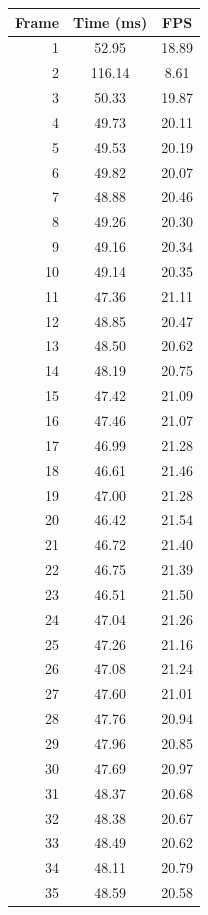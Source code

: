 \begin{table}[htbp]
  \centering\small
  \setlength{\tabcolsep}{8pt}
  \begin{tabular}{@{}rcc@{}}
    \toprule
    \textbf{Frame} & \textbf{Time (ms)} & \textbf{FPS} \\
    \midrule
    1 & 52.95 & 18.89 \\
    2 & 116.14 & 8.61 \\
    3 & 50.33 & 19.87 \\
    4 & 49.73 & 20.11 \\
    5 & 49.53 & 20.19 \\
    6 & 49.82 & 20.07 \\
    7 & 48.88 & 20.46 \\
    8 & 49.26 & 20.30 \\
    9 & 49.16 & 20.34 \\
    10 & 49.14 & 20.35 \\
    11 & 47.36 & 21.11 \\
    12 & 48.85 & 20.47 \\
    13 & 48.50 & 20.62 \\
    14 & 48.19 & 20.75 \\
    15 & 47.42 & 21.09 \\
    16 & 47.46 & 21.07 \\
    17 & 46.99 & 21.28 \\
    18 & 46.61 & 21.46 \\
    19 & 47.00 & 21.28 \\
    20 & 46.42 & 21.54 \\
    21 & 46.72 & 21.40 \\
    22 & 46.75 & 21.39 \\
    23 & 46.51 & 21.50 \\
    24 & 47.04 & 21.26 \\
    25 & 47.26 & 21.16 \\
    26 & 47.08 & 21.24 \\
    27 & 47.60 & 21.01 \\
    28 & 47.76 & 20.94 \\
    29 & 47.96 & 20.85 \\
    30 & 47.69 & 20.97 \\
    31 & 48.37 & 20.68 \\
    32 & 48.38 & 20.67 \\
    33 & 48.49 & 20.62 \\
    34 & 48.11 & 20.79 \\
    35 & 48.59 & 20.58 \\

\end{tabular}
\end{table}
